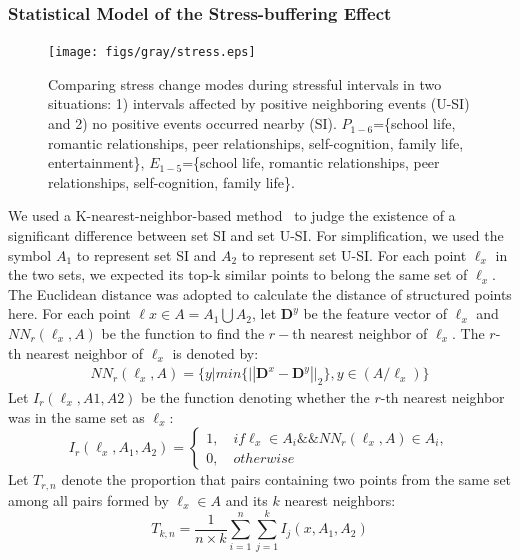\subsubsection{Statistical Model of the Stress-buffering Effect}
\begin{figure}
\centering
\texttt{[image: figs/gray/stress.eps]}
\caption{\small{Comparing stress change modes during stressful intervals in two situations:
1) intervals affected by positive neighboring events (U-SI) and
2) no positive events occurred nearby (SI).
$P_{1-6}$=\{school life, romantic relationships, peer relationships, self-cognition, family life, entertainment\},
$E_{1-5}$=\{school life, romantic relationships, peer relationships, self-cognition, family life\}.}}
\label{fig:stress}
\end{figure}
We used a K-nearest-neighbor-based method~\citep{Schilling1986Multivariate}
to judge the existence of a significant difference between set SI and set U-SI.
For simplification, we used the symbol $A_1$ to represent set SI and $A_2$ to represent set U-SI.
For each point $\ell_{x}$ in the two sets,
we expected its top-k similar points to belong the same set of $\ell_x$.
The Euclidean distance was adopted to calculate the distance of structured points here.
For each point $\ell x \in A=A_1\bigcup A_2$,
let $\textbf{D}^y$ be the feature vector of $\ell_x$ and $NN_r(\ell_x,A)$ be the function to find the $r-$th nearest neighbor of $\ell_x$.
The $r$-th nearest neighbor of $\ell_x$ is denoted by:
\begin{equation}
\begin{aligned}
& NN_r(\ell_x,A) = \{y | min\{||\textbf{D}^x-\textbf{D}^y ||_2\}, y\in(A/\ell_x)\} &
\end{aligned}
\end{equation}
Let $I_r(\ell_x,A1,A2)$ be the function denoting whether the $r$-th nearest neighbor was in the same set as $\ell_x$:
\begin{equation}
I_r(\ell_x,A_1,A_2) =
\left\{ \begin{array}{ll}
1, \quad if \ell_x \in A_i  \&\& NN_r(\ell_x,A)\in A_i,\\
0, \quad otherwise
\end{array}
\right.
\end{equation}
Let $T_{r,n}$ denote the proportion that pairs containing two points from the same set among all pairs formed by $\ell_x \in A$ and its $k$ nearest neighbors:
\begin{equation}
T_{k,n}= \frac{1}{n\times k}\sum_{i=1}^{n}\sum_{j=1}^{k}I_j(x,A_1,A_2)
\end{equation}
